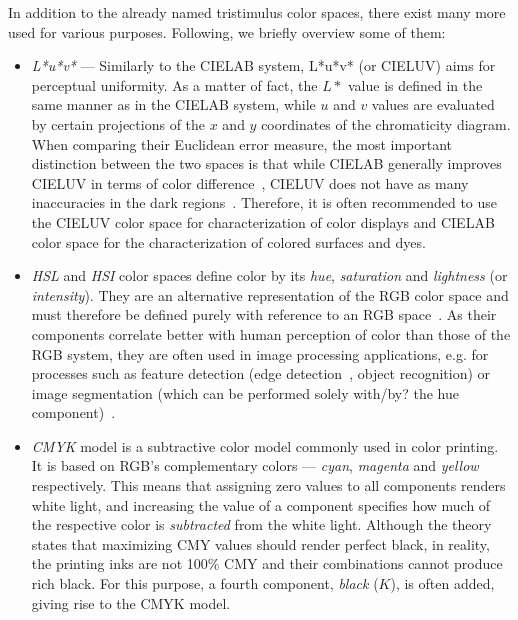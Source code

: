 In addition to the already named tristimulus color spaces, there exist many more used for various purposes. Following, we briefly overview some of them:
\begin{itemize}
\item \emph{L*u*v*} --- Similarly to the CIELAB system, L*u*v* (or CIELUV) aims for perceptual uniformity. As a matter of fact, the $L*$ value is defined in the same manner as in the CIELAB system, while $u$ and $v$ values are evaluated by certain projections of the $x$ and $y$ coordinates of the chromaticity diagram. When comparing their Euclidean error measure, the most important distinction between the two spaces is that while  CIELAB generally improves CIELUV in terms of color difference~\cite{CIELABcomparisonCIELUV}, CIELUV does not have as many inaccuracies in the dark regions~\cite{CIELABDarkSide}. Therefore, it is often recommended to use the CIELUV color space for characterization of color displays and CIELAB color space for the characterization of colored surfaces and dyes.

\item \emph{HSL} and \emph{HSI} color spaces define color by its \emph{hue}, \emph{saturation} and \emph{lightness} (or \emph{intensity}). They are an alternative representation of the RGB color space and must therefore be defined purely with reference to an RGB space~\cite{HSLreview}. As their components correlate better with human perception of color than those of the RGB system, they are often used in image processing applications, e.g. for processes such as feature detection (edge detection~\cite{edgeDetectionHSL}, object recognition) or image segmentation (which can be performed solely with/by? the hue component)~\cite{HSLreview}.

\item \emph{CMYK} model is a subtractive color model commonly used in color printing. It is based on RGB's complementary colors --- \emph{cyan}, \emph{magenta} and \emph{yellow} respectively. This means that assigning zero values to all components renders white light, and increasing the value of a component specifies how much of the respective color is \emph{subtracted} from the white light. Although the theory states that maximizing CMY values should render perfect black, in reality, the printing inks are not 100\% CMY and their combinations cannot produce rich black. For this purpose, a fourth component, \emph{black} ($K$), is often added, giving rise to the CMYK model.

\end{itemize}

